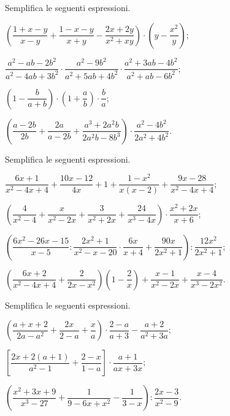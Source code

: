 \begin{esercizio}[\Ast]
\label{ese:14.54}
Semplifica le seguenti espressioni.
\begin{enumeratea}
 \item $\left(\dfrac{1+x-y}{x-y}+\dfrac{1-x-y}{x+y}-\dfrac{2x+2y}{x^{2}+xy}\right)\cdot \left(y-\dfrac{x^{2}}{y}\right)$;
 \item $\dfrac{a^{2}-ab-2b^{2}}{a^{2}-4ab+3b^{2}}\cdot\dfrac{a^{2}-9b^{2}}{a^{2}+5ab+4b^{2}}\cdot\dfrac{a^{2}+3ab-4b^{2}}{a^{2}+ab-6b^{2}}$;
 \item $\left(1-\dfrac{b}{a+b}\right)\cdot\left(1+\dfrac{a}{b}\right)\cdot \dfrac{b}{a}$;
 \item $\left(\dfrac{a-2b}{2b}+\dfrac{2a}{a-2b}+\dfrac{a^{3}+2a^{2}b}{2a^{2}b-8b^{3}}\right)\cdot\dfrac{a^{2}-4b^{2}}{2a^{2}+4b^{2}}$.
\end{enumeratea}
\end{esercizio}

\begin{esercizio}[\Ast]
\label{ese:14.55}
Semplifica le seguenti espressioni.
\begin{enumeratea}
 \item $\dfrac{6x+1}{x^{2}-4x+4}+\dfrac{10x-12}{4x}+1+\dfrac{1-x^{2}}{x(x-2)}+\dfrac{9x-28}{x^{2}-4x+4}$;
 \item $\left(\dfrac{4}{x^{2}-4}+\dfrac{x}{x^{2}-2x}+\dfrac{3}{x^{2}+2x}+\dfrac{24}{x^{3}-4x}\right)\cdot {\dfrac{x^{2}+2x}{x+6}}$;
 \item $\left(\dfrac{6x^{2}-26x-15}{x-5}:\dfrac{2x^{2}+1}{x^{2}-x-20}\cdot {\dfrac{6x}{x+4}+\dfrac{90x}{2x^{2}+1}}\right):\dfrac{12x^{2}}{2x^{2}+1}$;
 \item $\left(\dfrac{6x+2}{x^{2}-4x+4}+\dfrac{2}{2x-x^{2}}\right)\left(1-\dfrac{2}{x}\right)+\dfrac{x-1}{x^{2}-2x}+\dfrac{x-4}{x^{3}-2x^{2}}$.
\end{enumeratea}
\end{esercizio}

\begin{esercizio}[\Ast]
\label{ese:14.56}
Semplifica le seguenti espressioni.
\begin{enumeratea}
 \item $\left(\dfrac{a+x+2}{2a-a^{2}}+\dfrac{2x}{2-a}+\dfrac{x}{a}\right)\cdot {\dfrac{2-a}{a+3}}-\dfrac{a+2}{a^{2}+3a}$;
 \item $\left[\dfrac{2x+2(a+1)}{a^{2}-1}+\dfrac{2-x}{1-a}\right]\cdot {\dfrac{a+1}{ax+3x}}$;
 \item $\left(\dfrac{x^{2}+3x+9}{x^{3}-27}+\dfrac{1}{9-6x+x^{2}}-\dfrac{1}{3-x}\right):\dfrac{2x-3}{x^{2}-9}$.
\end{enumeratea}
\end{esercizio}

